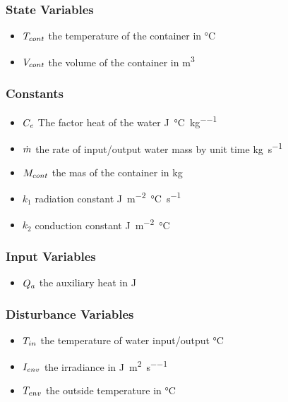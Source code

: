 \documentclass[a4paper,12pt,twoside,openright]{book}
\begin{document}
\vspace{5mm}

\subsubsection{State Variables}

\begin{itemize}
\item
  $T_{cont}$ the temperature of the container in \si{\degreeCelsius}
\item
  $V_{cont}$ the volume of the container in \si{\metre^3}

\end{itemize}

\subsubsection{Constants}
\begin{itemize}
\item
  $C_e$ The factor heat of the water \si{\joule\per\degreeCelsius\per\kilogram}
\item
  $\dot{m}$ the rate of input/output water mass by unit time \si{\kilogram\per\second}
\item
  $M_{cont}$ the mas of the container in \si{\kilogram}
\item
  $k_1$ radiation constant  \si{\joule\per\square\metre\degreeCelsius\per\second}
\item
  $k_2$ conduction constant \si{\joule\per\square\metre\degreeCelsius}

\end{itemize}

\subsubsection{Input Variables}
\begin{itemize}
\item
  $Q_{a}$ the auxiliary heat in \si{\joule}


\end{itemize}

\subsubsection{Disturbance Variables}
\begin{itemize}
\item 
  $T_{in}$ the temperature of water input/output \si{\degreeCelsius}
\item
  $I_{env}$ the irradiance in \si{\joule\per\square\metre\per\second}
\item
  $T_{env}$ the outside temperature in \si{\degreeCelsius}
\end{itemize}
\end{document}
